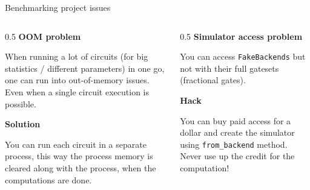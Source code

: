 \documentclass{beamer}
\begin{document}
\begin{frame}{Benchmarking project issues}
	\begin{columns}
		\begin{column}{0.5\linewidth}
			\textbf{OOM problem}\vspace{0.5cm}
			
			When running a lot of circuits (for big statistics / different parameters) in one go, one can run into out-of-memory issues. Even when a single circuit execution is possible.\vspace{0.5cm}
			
			\textbf{Solution}\vspace{0.5cm}
			
			You can run each circuit in a separate process, this way the process memory is cleared along with the process, when the computations are done.
			
		\end{column}
		
		\begin{column}{0.5\linewidth}
			\textbf{Simulator access problem}\vspace{0.5cm}
			
			You can access \texttt{FakeBackends} but not with their full gatesets (fractional gates). \vspace{0.5cm}
			
			\textbf{Hack}\vspace{0.5cm}
			
			You can buy paid access for a dollar and create the simulator using \texttt{from\_backend} method. Never use up the credit for the computation!
			
			\vspace{1cm}
			
		\end{column}
	\end{columns}
\end{frame}
\end{document}
